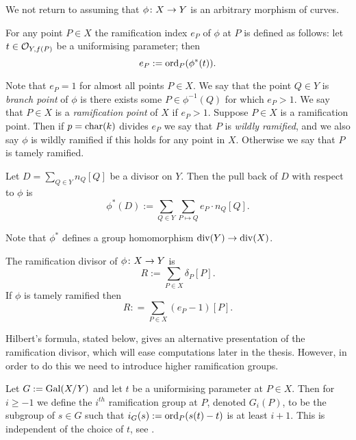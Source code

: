 We not return to assuming that $\phi \colon X \rightarrow Y$ is an arbitrary morphism of curves.

    \begin{defn}
    For any point $P \in X$ the ramification index $e_P$ of $\phi$ at $P$ is defined as follows: let $t \in {\cal O}_{Y,f(P)}$ be a uniformising parameter; then 
        \[
        e_P := \operatorname{ord}_P(\phi^*(t)).
        \]
    \end{defn}

Note that $e_P =1$ for almost all points $P \in X$.
We say that the point $Q \in Y$ is \emph{branch point} of $\phi$ is there exists some $P \in \phi^{-1}(Q)$ for which $e_P >1$.
We say that $P \in X$ is a \emph{ramification point} of $X$ if $e_P >1$.
Suppose $P \in X$ is a ramification point.
Then if $p = \operatorname{char}(k)$ divides $e_P$ we say that $P$ is \emph{wildly ramified}, and we also say $\phi$ is wildly ramified if this holds for any point in $X$.
Otherwise we say that $P$ is tamely ramified.

    \begin{defn}
    Let $D = \sum_{Q \in Y}n_Q [Q]$ be a divisor on $Y$.
    Then the pull back of $D$ with respect to $\phi$ is
        \[
        \phi^*(D) := \sum_{Q \in Y} \sum_{P \mapsto Q} e_P \cdot n_Q [Q].
        \]
    \end{defn}

Note that $\phi^*$ defines a group homomorphism $\operatorname{div}(Y) \rightarrow \operatorname{div}(X)$.

    \begin{defn}
    The ramification divisor of $\phi \colon X \rightarrow Y$ is 
        \[
        R:= \sum_{P \in X} \delta_P [P].
        \]
    If $\phi$ is tamely ramified then 
        \[
        R: = \sum_{P \in X} (e_P - 1)[P].
        \]
    \end{defn}

Hilbert's formula, stated below, gives an alternative presentation of the ramification divisor, which will ease computations later in the thesis.
However, in order to do this we need to introduce higher ramification groups.

   \begin{defn}
    Let $G:=\operatorname{Gal}(X/Y)$ and let $t$ be a uniformising parameter at $P\in X$.
    Then for $i\geq -1$ we define the $i^{th}$ ramification group at $P$, denoted $G_i(P)$, to be the subgroup of $s\in G$ such that $i_G(s) := \operatorname{ord}_P(s(t)-t)$ is at least $i+1$.
    This is	independent of the choice of $t$, see \cite[Chap. IV, \S 1, pg. 62]{localfields}.
    \end{defn}

